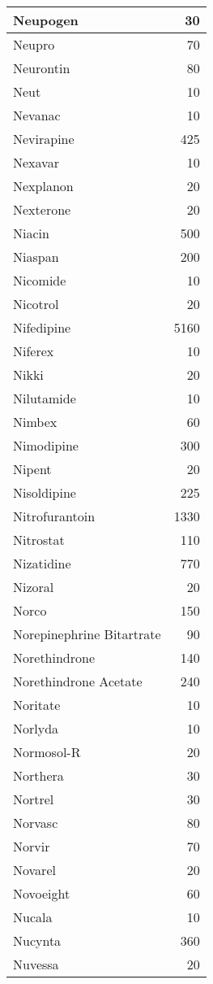 \documentclass[
]{article}
\begin{document}
\begin{table}
\begin{tabular}[t]{l|r}
\hline
Neupogen & 30\\
\hline
Neupro & 70\\
\hline
Neurontin & 80\\
\hline
Neut & 10\\
\hline
Nevanac & 10\\
\hline
Nevirapine & 425\\
\hline
Nexavar & 10\\
\hline
Nexplanon & 20\\
\hline
Nexterone & 20\\
\hline
Niacin & 500\\
\hline
Niaspan & 200\\
\hline
Nicomide & 10\\
\hline
Nicotrol & 20\\
\hline
Nifedipine & 5160\\
\hline
Niferex & 10\\
\hline
Nikki & 20\\
\hline
Nilutamide & 10\\
\hline
Nimbex & 60\\
\hline
Nimodipine & 300\\
\hline
Nipent & 20\\
\hline
Nisoldipine & 225\\
\hline
Nitrofurantoin & 1330\\
\hline
Nitrostat & 110\\
\hline
Nizatidine & 770\\
\hline
Nizoral & 20\\
\hline
Norco & 150\\
\hline
Norepinephrine Bitartrate & 90\\
\hline
Norethindrone & 140\\
\hline
Norethindrone Acetate & 240\\
\hline
Noritate & 10\\
\hline
Norlyda & 10\\
\hline
Normosol-R & 20\\
\hline
Northera & 30\\
\hline
Nortrel & 30\\
\hline
Norvasc & 80\\
\hline
Norvir & 70\\
\hline
Novarel & 20\\
\hline
Novoeight & 60\\
\hline
Nucala & 10\\
\hline
Nucynta & 360\\
\hline
Nuvessa & 20\\

\end{tabular}
\end{table}
\end{document}
